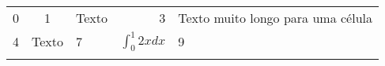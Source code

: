 \begin{table}[h]
	\begin{tabular}{l|c|l||r||p{3cm}}
		0 & 1 & Texto & 3 & Texto muito longo para uma célula \\
		4 & Texto & 7 & $\int_0^1 2x dx$ & 9 \\ \hline
		&  &  &  &
	\end{tabular}
\end{table}